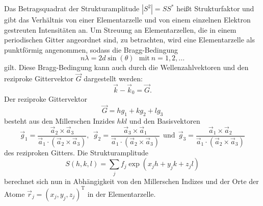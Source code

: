 Das Betragsquadrat der Strukturamplitude  $|S^2|=SS^*$ heißt Strukturfaktor und gibt das Verhältnis von einer Elementarzelle und von einem einzelnen Elektron gestreuten Intensitäten an.
Um Streuung an Elementarzellen, die in einem periodischen Gitter angeordnet sind, zu betrachten, wird eine Elementarzelle als punktförmig angenommen, sodass die Bragg-Bedingung
\begin{equation}
  n\lambda=2d\sin\left(\theta\right)~~~\text{mit}~n=1,2,...
  \label{eq:bragg}
\end{equation}
gilt.
Diese Bragg-Bedingung kann auch durch die Wellenzahlvektoren und den reziproke Gittervektor $\vec G$ dargestellt werden:
\begin{equation}
  \vec k -\vec k_0 =\vec G.
\end{equation}
Der reziproke Gittervektor
\begin{equation}
  \vec G= h g_1+kg_2+lg_3
\end{equation}
besteht aus den Millerschen Inzides $hkl$ und den Basisvektoren
\begin{equation}
   \vec g_1=\frac{\vec a_2\times \vec a_3}{\vec a_1 \cdot \left(\vec a_2 \times \vec a_3\right)}, ~~  \vec g_2=\frac{\vec a_3\times \vec a_1}{\vec a_1 \cdot \left(\vec a_2 \times \vec a_3\right)}~~\text{und}~~  \vec g_3=\frac{\vec a_1\times \vec a_2}{\vec a_1 \cdot \left(\vec a_2 \times \vec a_3\right)}
\end{equation}
des reziproken Gitters.
Die Strukturamplitude
\begin{equation}
  \label{eq:streuamplitude}
  S(h,k,l)=\sum _j f_j\exp\left(x_j h+ y_jk+z_j l\right)
\end{equation}
berechnet sich nun in Abhängigkeit von den Millerschen Indizes und der Orte der Atome $\vec r_j=\left(x_j, y_j, z_j\right)^\text{T}$  in der Elementarzelle.
